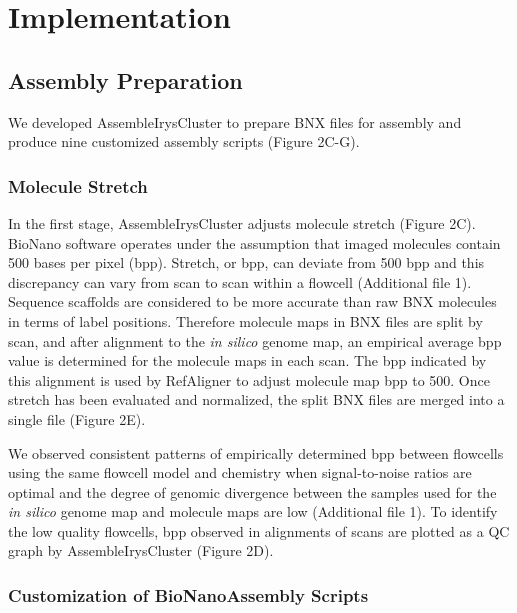 \documentclass{bmcart}
\begin{document}
\section*{Implementation}
\subsection*{Assembly Preparation}
We developed AssembleIrysCluster to prepare BNX files for assembly and produce nine customized assembly scripts (Figure 2C-G).
\subsubsection*{Molecule Stretch}
In the first stage, AssembleIrysCluster adjusts molecule stretch (Figure 2C). BioNano software operates under the assumption that imaged molecules contain 500 bases per pixel (bpp). Stretch, or bpp, can deviate from 500 bpp and this discrepancy can vary from scan to scan within a flowcell (Additional file 1). Sequence scaffolds are considered to be more accurate than raw BNX molecules in terms of label positions. Therefore molecule maps in BNX files are split by scan, and after alignment to the \textit{in silico} genome map, an empirical average bpp value is determined for the molecule maps in each scan. The bpp indicated by this alignment is used by RefAligner to adjust molecule map bpp to 500. Once stretch has been evaluated and normalized, the split BNX files are merged into a single file (Figure 2E).

We observed consistent patterns of empirically determined bpp between flowcells using the same flowcell model and chemistry when signal-to-noise ratios are optimal and the degree of genomic divergence between the samples used for the \textit{in silico} genome map and molecule maps are low (Additional file 1). To identify the low quality flowcells, bpp observed in alignments of scans are plotted as a QC graph by AssembleIrysCluster (Figure 2D). 

\subsubsection*{Customization of BioNanoAssembly Scripts}
\end{document}
